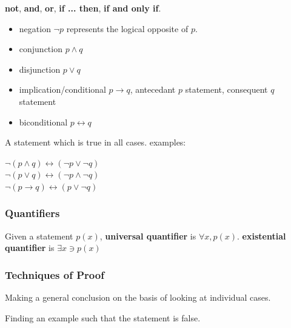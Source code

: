 \documentclass[12pt]{article}
\begin{document}
\begin{definition} 
  \textbf{not}, \textbf{and}, \textbf{or}, \textbf{if ... then}, \textbf{if and
    only if}.
  \begin{itemize}
  \item negation $\neg p$ represents the logical opposite of $p$.
  \item conjunction $p \land{} q$
  \item disjunction $p \lor q$
  \item implication/conditional $p \rightarrow q$, antecedant $p$ statement, consequent
    $q$ statement
  \item biconditional $p \leftrightarrow q$
  \end{itemize}
\end{definition}

\begin{definition}[tautology] 
  A statement which is true in all cases. examples:
  \begin{center}
    $\neg(p \land{} q) \leftrightarrow (\neg p \lor \neg q)$ \\
    $\neg(p \lor q) \leftrightarrow (\neg p \land \neg q)$ \\
    $\neg(p \rightarrow q) \leftrightarrow (p \lor \neg q)$
  \end{center}
\end{definition}

\subsubsection{Quantifiers}
\label{sec:orgcb17323}
\begin{definition}[Quantifier]
  Given a statement $p(x)$, \textbf{universal quantifier} is $\forall x,
  p(x)$. \textbf{existential quantifier} is $\exists x \ni p(x)$
\end{definition}

\subsubsection{Techniques of Proof}
\label{sec:org950d434}
\begin{definition}
  Making a general conclusion on the basis of looking at individual cases.
\end{definition}

\begin{definition}[Counterexample]
  Finding an example such that the statement is false.
\end{definition}
\end{document}
